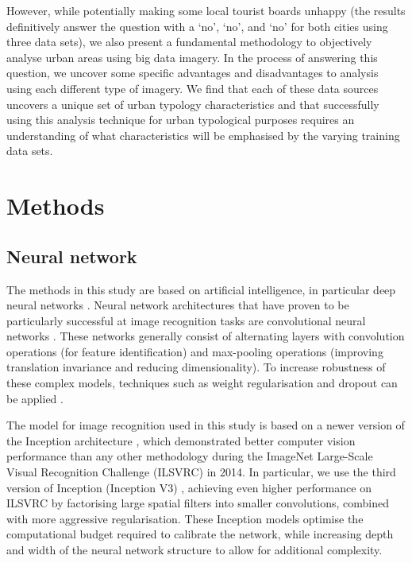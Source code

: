 \documentclass[sageh,times]{sagej}
\begin{document}
However, while potentially making some local tourist boards unhappy (the results definitively answer the question with a `no', `no', and `no' for both cities using three data sets), we also present a fundamental methodology to objectively analyse urban areas using big data imagery. In the process of answering this question, we uncover some specific advantages and disadvantages to analysis using each different type of imagery. We find that each of these data sources uncovers a unique set of urban typology characteristics and that successfully using this analysis technique for urban typological purposes requires an understanding of what characteristics will be emphasised by the varying training data sets.




\section{Methods}\label{sec:methods}
\subsection{Neural network}\label{sec:methods1}

The methods in this study are based on artificial intelligence, in particular deep neural networks \citep{Bishop1995,Samarasinghe2016,Graupe2013}. Neural network architectures that have proven to be particularly successful at image recognition tasks are convolutional neural networks \citep{Schmidhuber2015}. These networks generally consist of alternating layers with convolution operations (for feature identification) and max-pooling operations (improving translation invariance and reducing dimensionality). To increase robustness of these complex models, techniques such as weight regularisation and dropout can be applied \citep{Srivastava2014}.

The model for image recognition used in this study is based on a newer version of the Inception architecture \citep{Szegedy2015}, which demonstrated better computer vision performance than any other methodology during the ImageNet Large-Scale Visual Recognition Challenge (ILSVRC) \citep{Russakovsky2015} in 2014. In particular, we use the third version of Inception (Inception V3) \citep{Szegedy2015a}, achieving even higher performance on ILSVRC by factorising large spatial filters into smaller convolutions, combined with more aggressive regularisation. These Inception models optimise the computational budget required to calibrate the network, while increasing depth and width of the neural network structure to allow for additional complexity.
\end{document}
